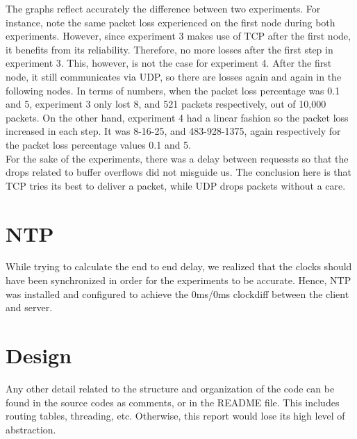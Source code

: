 \documentclass[12pt]{article}
\begin{document}
The graphs reflect accurately the difference between two experiments. For instance, note the same packet loss experienced on the first node during both experiments. However, since experiment 3 makes use of TCP after the first node, it benefits from its reliability. Therefore, no more losses after the first step in experiment 3. This, however, is not the case for experiment 4. After the first node, it still communicates via UDP, so there are losses again and again in the following nodes. In terms of numbers, when the packet loss percentage was 0.1 and 5, experiment 3 only lost 8, and 521 packets respectively, out of 10,000 packets. On the other hand, experiment 4 had a linear fashion so the packet loss increased in each step. It was 8-16-25, and 483-928-1375, again respectively for the packet loss percentage values 0.1 and 5.
\\

For the sake of the experiments, there was a delay between requessts so that the drops related to buffer overflows did not misguide us. The conclusion here is that TCP tries its best to deliver a packet, while UDP drops packets without a care.


\section*{NTP}
While trying to calculate the end to end delay, we realized that the clocks should have been synchronized in order for the experiments to be accurate. Hence, NTP was installed and configured to achieve the 0ms/0ms clockdiff between the client and server.




\section*{Design}
Any other detail related to the structure and organization of the code can be found in the source codes as comments, or in the README file. This includes routing tables, threading, etc. Otherwise, this report would lose its high level of abstraction.
\end{document}
